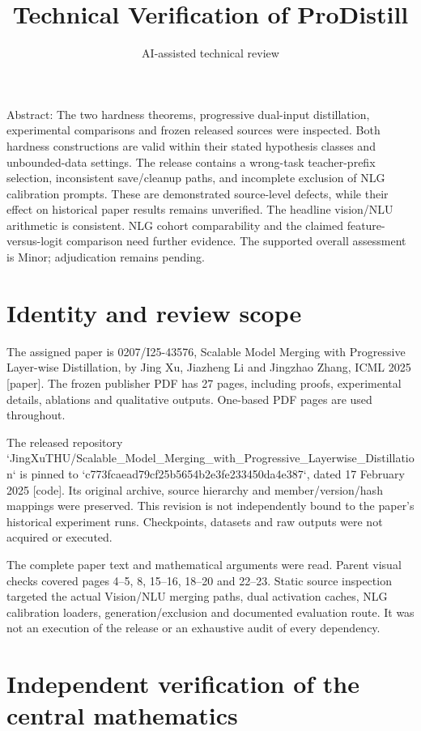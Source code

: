\documentclass[10pt]{article}
\title{Technical Verification of ProDistill}
\author{AI-assisted technical review}
\date{}
\begin{document}
\maketitle
Abstract: The two hardness theorems, progressive dual-input distillation, experimental comparisons and frozen released sources were inspected. Both hardness constructions are valid within their stated hypothesis classes and unbounded-data settings. The release contains a wrong-task teacher-prefix selection, inconsistent save/cleanup paths, and incomplete exclusion of NLG calibration prompts. These are demonstrated source-level defects, while their effect on historical paper results remains unverified. The headline vision/NLU arithmetic is consistent. NLG cohort comparability and the claimed feature-versus-logit comparison need further evidence. The supported overall assessment is Minor; adjudication remains pending.\par
\section*{Identity and review scope}
The assigned paper is 0207/I25-43576, Scalable Model Merging with Progressive Layer-wise Distillation, by Jing Xu, Jiazheng Li and Jingzhao Zhang, ICML 2025 [paper]. The frozen publisher PDF has 27 pages, including proofs, experimental details, ablations and qualitative outputs. One-based PDF pages are used throughout.\par
The released repository `JingXuTHU/Scalable\_Model\_Merging\_with\_Progressive\_Layerwise\_Distillation` is pinned to `c773fcaead79cf25b5654b2e3fe233450da4e387`, dated 17 February 2025 [code]. Its original archive, source hierarchy and member/version/hash mappings were preserved. This revision is not independently bound to the paper’s historical experiment runs. Checkpoints, datasets and raw outputs were not acquired or executed.\par
The complete paper text and mathematical arguments were read. Parent visual checks covered pages 4–5, 8, 15–16, 18–20 and 22–23. Static source inspection targeted the actual Vision/NLU merging paths, dual activation caches, NLG calibration loaders, generation/exclusion and documented evaluation route. It was not an execution of the release or an exhaustive audit of every dependency.\par
\section*{Independent verification of the central mathematics}
\end{document}
